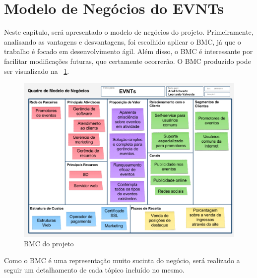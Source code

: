 \section{Modelo de Negócios do EVNTs}

Neste capítulo, será apresentado o modelo de negócios do projeto. Primeiramente, analisando as vantagens e desvantagens, foi escolhido aplicar o BMC, já que o trabalho é focado em desenvolvimento ágil. Além disso, o BMC é interessante por facilitar modificações futuras, que certamente ocorrerão. O BMC produzido pode ser visualizado na ~\ref{fig:bmc}.

\begin{figure}[H]
\centering
\includegraphics[width=1\textwidth]{figs/bmc}
\caption[\textit{BMC do projeto}]
{BMC do projeto}
\label{fig:bmc}
\end{figure}

Como o BMC é uma representação muito sucinta do negócio, será realizado a seguir um detalhamento de cada tópico incluído no mesmo.

